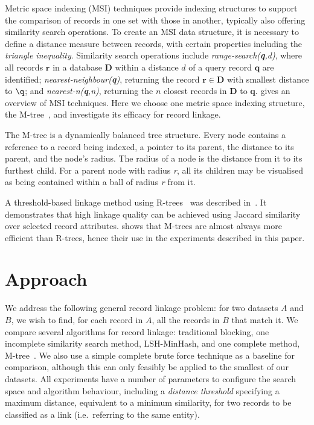 \documentclass{llncs}
\begin{document}
Metric space indexing (MSI) techniques provide indexing structures to
support the comparison of records in one set with those in another,
typically also offering similarity search operations. To create an MSI
data structure, it is necessary to define a distance measure between
records, with certain properties including the \emph{triangle
inequality}. Similarity search operations include
\emph{range-search(\textbf{q},d)}, where all records $\mathbf{r}$
in a database $\mathbf{D}$ within a distance $d$ of a query record
$\mathbf{q}$ are identified; \emph{nearest-neighbour(\textbf{q})},
returning the record $\mathbf{r} \in \mathbf{D}$ with smallest
distance to $\q$; and \emph{nearest-n(\textbf{q},n)}, returning
the $n$ closest records in $\mathbf{D}$ to $\mathbf{q}$.
\cite{Zezula2010} gives an overview of MSI techniques. Here we choose
one metric space indexing structure, the M-tree~\cite{paolociaccia2m},
and investigate its efficacy for record linkage.

The M-tree is a dynamically balanced tree structure. Every node contains
a reference to a record being indexed, a pointer to its parent, the
distance to its parent, and the node's radius. The radius of a node is
the distance from it to its furthest child. For a parent node with
radius \textit{r}, all its children may be visualised as being contained
within a ball of radius \textit{r} from it.

A threshold-based linkage method using R-trees~\cite{Hjaltason1998}
was described in~\cite{Li2006}. It demonstrates that high linkage
quality can be achieved using Jaccard similarity over selected record
attributes. \cite{Ciaccia97indexingmetric} shows that M-trees are
almost always more efficient than R-trees, hence their use in the
experiments described in this paper.


\section{Approach}
\label{sec-approach}

We address the following general record linkage problem: for two
datasets $A$ and $B$, we wish to find, for each record in $A$, all the
records in $B$ that match it. We compare several algorithms for record
linkage: traditional blocking, one incomplete similarity search method,
LSH-MinHash, and one complete method, M-tree~\cite{paolociaccia2m}. We
also use a simple complete brute force technique as a baseline for
comparison, although this can only feasibly be applied to the smallest
of our datasets. All experiments have a number of parameters to
configure the search space and algorithm behaviour, including a
\emph{distance threshold} specifying a maximum distance, equivalent to a
minimum similarity, for two records to be classified as a link (i.e.\
referring to the same entity).
\end{document}
